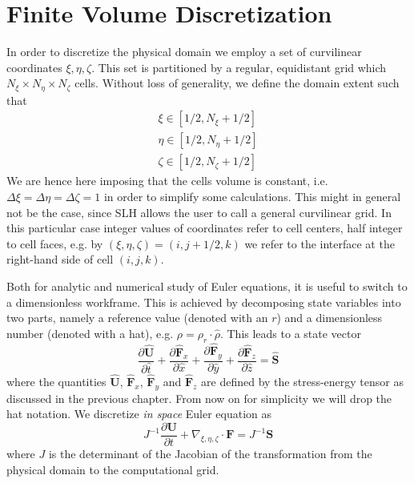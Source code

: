 \section{Finite Volume Discretization}
In order to discretize the physical domain we employ a set of curvilinear coordinates $\xi, \eta, \zeta$. This set is partitioned by a regular, equidistant grid which $N_{\xi} \times N_{\eta} \times N_{\zeta}$ cells. Without loss of generality, we define the domain extent such that
\begin{equation}
\begin{split}
\xi \in [1/2, N_{\xi} + 1/2] \\
\eta \in [1/2, N_{\eta} + 1/2] \\
\zeta \in [1/2, N_{\zeta} + 1/2] 
\end{split}
\end{equation}
We are hence here imposing that the cells volume is constant, i.e. $\Delta \xi = \Delta \eta = \Delta \zeta = 1$ in order to simplify some calculations. This might in general not be the case, since SLH allows the user to call a general curvilinear grid. In this particular case integer values of coordinates refer to cell centers, half integer to cell faces, e.g. by $(\xi, \eta, \zeta) = (i, j + 1/2, k)$ we refer to the interface at the right-hand side of cell $(i, j, k)$.

Both for analytic and numerical study of Euler equations, it is useful to switch to a dimensionless workframe. This is achieved by decomposing state variables into two parts, namely a reference value (denoted with an $r$) and a dimensionless number (denoted with a hat), e.g. $\rho = \rho_r \cdot \hat{\rho}$. This leads to a state vector 
\begin{equation}
\frac{\partial \mathbf{\hat{U}}}{\partial \hat{t}} + \frac{\partial \mathbf{\hat{F}}_x}{\partial \hat{x}} + \frac{\partial \mathbf{\hat{F}}_y}{\partial \hat{y}} + \frac{\partial \mathbf{\hat{F}}_z}{\partial \hat{z}} = \mathbf{\hat{S}}
\end{equation}
where the quantities $\mathbf{\hat{U}}$, $\mathbf{\hat{F}}_x$, $\mathbf{\hat{F}}_y$ and $\mathbf{\hat{F}}_z$ are defined by the stress-energy tensor as discussed in the previous chapter. From now on for simplicity we will drop the hat notation. We discretize \textit{in space} Euler equation as 
\begin{equation}
J^{-1}\frac{\partial \mathbf{U}}{\partial t} + \nabla_{\xi, \eta, \zeta} \cdot \mathbf{F} = J^{-1} \mathbf{S}
\end{equation}
where $J$ is the determinant of the Jacobian of the transformation from the physical domain to the computational grid.

